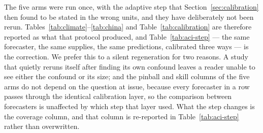 The five arms were run once, with the adaptive step that
Section~\ref{sec:calibration} then found to be stated in the wrong units, and
they have deliberately not been rerun. Tables~\ref{tab:climate}--\ref{tab:china}
and Table~\ref{tab:calibration} are therefore reported as what that protocol
produced, and Table~\ref{tab:aci-step} --- the same forecaster, the same
supplies, the same predictions, calibrated three ways --- is the correction. We
prefer this to a silent regeneration for two reasons. A study that quietly
reruns itself after finding its own confound leaves a reader unable to see
either the confound or its size; and the pinball and skill columns of the five
arms do not depend on the question at issue, because every forecaster in a row
passes through the identical calibration layer, so the comparison between
forecasters is unaffected by which step that layer used. What the step changes
is the coverage column, and that column is re-reported in
Table~\ref{tab:aci-step} rather than overwritten.
